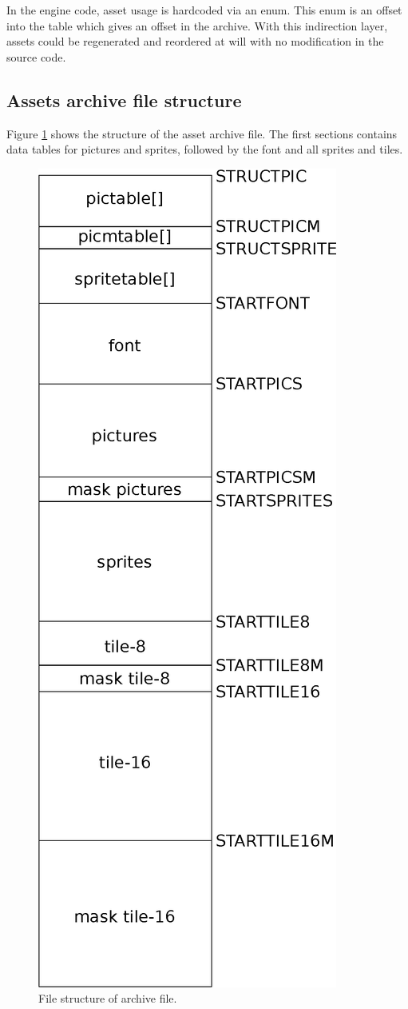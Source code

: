 \documentclass[book.tex]{subfiles}
\begin{document}
\par
In the engine code, asset usage is hardcoded via an enum. This enum is an offset into
the  table which gives an offset in the  archive. With this indirection layer, assets could be regenerated and reordered at will with no modification in the source code. \\


\par
\begin{minipage}{\textwidth}
 \par
 \end{minipage}
 


 

\subsection{Assets archive file structure}
\label{section:asset_file_structure}
Figure \ref{fig:asset-file} shows the structure of the  asset archive file. The first sections contains data tables for pictures and sprites, followed by the font and all sprites and tiles.\\
\begin{figure}[H]
\centering
 \includegraphics[width=.4\textwidth]{imgs/drawings/graphic_assets.eps}
 \caption{File structure of  archive file.}
 \label{fig:asset-file}
\end{figure}
\end{document}
